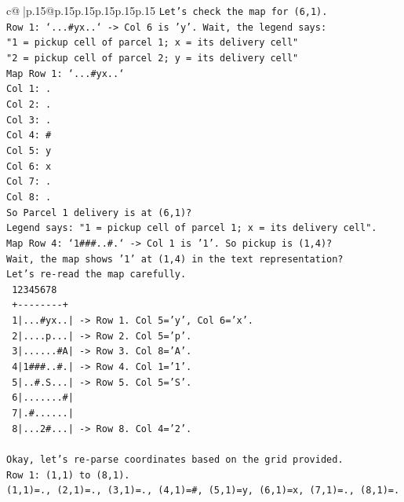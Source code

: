 \documentclass{article}
\begin{document}
{\begin{supertabular}{c@{$\;$}|p{.15\linewidth}@{}p{.15\linewidth}p{.15\linewidth}p{.15\linewidth}p{.15\linewidth}p{.15\linewidth}}
{{{\texttt{Let's check the map for (6,1).} \\
\texttt{Row 1: `...\#yx..` {-}> Col 6 is 'y'. Wait, the legend says:} \\
\texttt{"1 = pickup cell of parcel 1; x = its delivery cell"} \\
\texttt{"2 = pickup cell of parcel 2; y = its delivery cell"} \\
\texttt{Map Row 1: `...\#yx..`} \\
\texttt{Col 1: .} \\
\texttt{Col 2: .} \\
\texttt{Col 3: .} \\
\texttt{Col 4: \#} \\
\texttt{Col 5: y} \\
\texttt{Col 6: x} \\
\texttt{Col 7: .} \\
\texttt{Col 8: .} \\
\texttt{So Parcel 1 delivery is at (6,1)?} \\
\texttt{Legend says: "1 = pickup cell of parcel 1; x = its delivery cell".} \\
\texttt{Map Row 4: `1\#\#\#..\#.` {-}> Col 1 is '1'. So pickup is (1,4)?} \\
\texttt{Wait, the map shows '1' at (1,4) in the text representation?} \\
\texttt{Let's re{-}read the map carefully.} \\
\texttt{   12345678} \\
\texttt{  +{-}{-}{-}{-}{-}{-}{-}{-}+} \\
\texttt{ 1|...\#yx..|  {-}> Row 1. Col 5='y', Col 6='x'.} \\
\texttt{ 2|....p...|  {-}> Row 2. Col 5='p'.} \\
\texttt{ 3|......\#A|  {-}> Row 3. Col 8='A'.} \\
\texttt{ 4|1\#\#\#..\#.|  {-}> Row 4. Col 1='1'.} \\
\texttt{ 5|..\#.S...|  {-}> Row 5. Col 5='S'.} \\
\texttt{ 6|.......\#|} \\
\texttt{ 7|.\#......|} \\
\texttt{ 8|...2\#...|  {-}> Row 8. Col 4='2'.} \\
\\ 
\texttt{Okay, let's re{-}parse coordinates based on the grid provided.} \\
\texttt{Row 1: (1,1) to (8,1).} \\
\texttt{(1,1)=., (2,1)=., (3,1)=., (4,1)=\#, (5,1)=y, (6,1)=x, (7,1)=., (8,1)=.} \\
}}}
\end{supertabular}}
\end{document}
